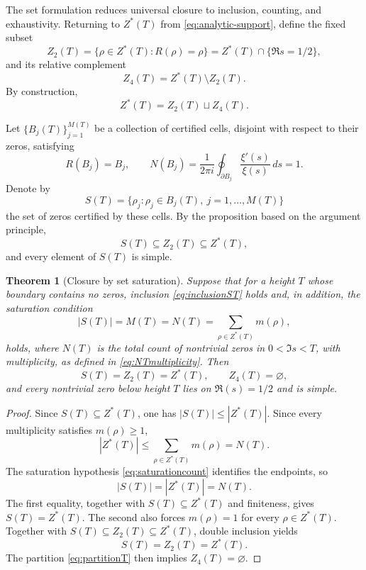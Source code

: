 \documentclass[11pt]{amsart}
\newtheorem{theorem}{Theorem}[section]
\theoremstyle{definition}
\theoremstyle{remark}
\begin{document}
The set formulation reduces universal closure to inclusion, counting, and exhaustivity. Returning to $Z^*(T)$ from \eqref{eq:analytic-support}, define the fixed subset
\begin{equation}\label{eq:Z2T}
 Z_2(T)=\{\rho\in Z^*(T):R(\rho)=\rho\}
       =Z^*(T)\cap\{\Re s=1/2\},
\end{equation}
and its relative complement
\begin{equation}\label{eq:Z4T}
 Z_4(T)=Z^*(T)\setminus Z_2(T).
\end{equation}
By construction,
\begin{equation}\label{eq:partitionT}
 Z^*(T)=Z_2(T)\sqcup Z_4(T).
\end{equation}

Let $\{B_j(T)\}_{j=1}^{M(T)}$ be a collection of certified cells, disjoint with respect to their zeros, satisfying
\begin{equation}\label{eq:cellcertT}
 R(B_j)=B_j,\qquad
 N(B_j)=\frac{1}{2\pi i}\oint_{\partial B_j}\frac{\xi'(s)}{\xi(s)}\,ds=1.
\end{equation}
Denote by
\begin{equation}\label{eq:ST}
 S(T)=\{\rho_j:\rho_j\in B_j(T),\ j=1,\ldots,M(T)\}
\end{equation}
the set of zeros certified by these cells. By the proposition based on the argument principle,
\begin{equation}\label{eq:inclusionST}
 S(T)\subseteq Z_2(T)\subseteq Z^*(T),
\end{equation}
and every element of $S(T)$ is simple.

\begin{theorem}[Closure by set saturation]\label{thm:saturation}
Suppose that for a height $T$ whose boundary contains no zeros, inclusion \eqref{eq:inclusionST} holds and, in addition, the saturation condition
\begin{equation}\label{eq:saturationcount}
 |S(T)|=M(T)=N(T)=\sum_{\rho\in Z^*(T)}m(\rho),
\end{equation}
holds, where $N(T)$ is the total count of nontrivial zeros in $0<\Im s<T$, with multiplicity, as defined in \eqref{eq:NTmultiplicity}. Then
\begin{equation}\label{eq:saturationequality}
 S(T)=Z_2(T)=Z^*(T),\qquad Z_4(T)=\varnothing,
\end{equation}
and every nontrivial zero below height $T$ lies on $\Re(s)=1/2$ and is simple.
\end{theorem}

\begin{proof}
Since $S(T)\subseteq Z^*(T)$, one has $|S(T)|\le |Z^*(T)|$. Since every multiplicity satisfies $m(\rho)\ge1$,
\[
 |Z^*(T)|\le \sum_{\rho\in Z^*(T)}m(\rho)=N(T).
\]
The saturation hypothesis \eqref{eq:saturationcount} identifies the endpoints, so
\[
 |S(T)|=|Z^*(T)|=N(T).
\]
The first equality, together with $S(T)\subseteq Z^*(T)$ and finiteness, gives $S(T)=Z^*(T)$. The second also forces $m(\rho)=1$ for every $\rho\in Z^*(T)$. Together with $S(T)\subseteq Z_2(T)\subseteq Z^*(T)$, double inclusion yields
\[
 S(T)=Z_2(T)=Z^*(T).
\]
The partition \eqref{eq:partitionT} then implies $Z_4(T)=\varnothing$.
\end{proof}
\end{document}
